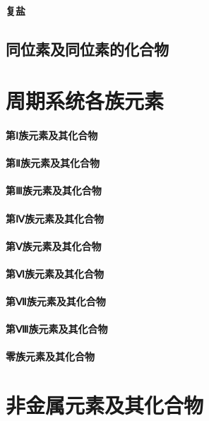 \documentclass[UTF8]{../03-Chemistry}
\begin{document}
    \subsubsection{复盐}
\section{同位素及同位素的化合物}



\chapter{周期系统各族元素}
    \subsubsection{第Ⅰ族元素及其化合物}
    \subsubsection{第Ⅱ族元素及其化合物}
    \subsubsection{第Ⅲ族元素及其化合物}
    \subsubsection{第Ⅳ族元素及其化合物}
    \subsubsection{第Ⅴ族元素及其化合物}
    \subsubsection{第Ⅵ族元素及其化合物}
    \subsubsection{第Ⅶ族元素及其化合物}
    \subsubsection{第Ⅷ族元素及其化合物}
    \subsubsection{零族元素及其化合物}



\chapter{非金属元素及其化合物}
\end{document}
